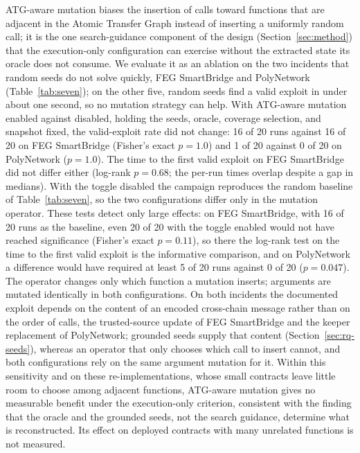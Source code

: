 \documentclass[a4paper]{cas-sc}
\begin{document}
ATG-aware mutation biases the insertion of calls toward functions that are adjacent in the Atomic Transfer Graph instead of inserting a uniformly random call; it is the one search-guidance component of the design (Section~\ref{sec:method}) that the execution-only configuration can exercise without the extracted state its oracle does not consume. We evaluate it as an ablation on the two incidents that random seeds do not solve quickly, FEG SmartBridge and PolyNetwork (Table~\ref{tab:seven}); on the other five, random seeds find a valid exploit in under about one second, so no mutation strategy can help. With ATG-aware mutation enabled against disabled, holding the seeds, oracle, coverage selection, and snapshot fixed, the valid-exploit rate did not change: 16 of 20 runs against 16 of 20 on FEG SmartBridge (Fisher's exact $p=1.0$) and 1 of 20 against 0 of 20 on PolyNetwork ($p=1.0$). The time to the first valid exploit on FEG SmartBridge did not differ either (log-rank $p=0.68$; the per-run times overlap despite a gap in medians). With the toggle disabled the campaign reproduces the random baseline of Table~\ref{tab:seven}, so the two configurations differ only in the mutation operator. These tests detect only large effects: on FEG SmartBridge, with 16 of 20 runs as the baseline, even 20 of 20 with the toggle enabled would not have reached significance (Fisher's exact $p=0.11$), so there the log-rank test on the time to the first valid exploit is the informative comparison, and on PolyNetwork a difference would have required at least 5 of 20 runs against 0 of 20 ($p=0.047$). The operator changes only which function a mutation inserts; arguments are mutated identically in both configurations. On both incidents the documented exploit depends on the content of an encoded cross-chain message rather than on the order of calls, the trusted-source update of FEG SmartBridge and the keeper replacement of PolyNetwork; grounded seeds supply that content (Section~\ref{sec:rq-seeds}), whereas an operator that only chooses which call to insert cannot, and both configurations rely on the same argument mutation for it. Within this sensitivity and on these re-implementations, whose small contracts leave little room to choose among adjacent functions, ATG-aware mutation gives no measurable benefit under the execution-only criterion, consistent with the finding that the oracle and the grounded seeds, not the search guidance, determine what is reconstructed. Its effect on deployed contracts with many unrelated functions is not measured.
\end{document}
